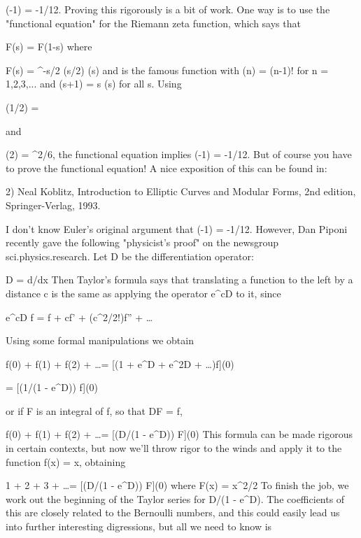                           \zeta (-1) = -1/12.
Proving this rigorously is a bit of work.  One way is to use the
"functional equation" for the Riemann zeta function, which says that 

                             F(s) = F(1-s)
where 

                    F(s) = \pi ^{-s/2} \Gamma (s/2) \zeta (s)
and \Gamma  is the famous function with \Gamma (n) = (n-1)! for n = 1,2,3,...
and \Gamma (s+1) = s \Gamma (s) for all s.  Using 

                       \Gamma (1/2) = \sqrt \pi 

and

                       \zeta (2) = \pi ^{2}/6,
the functional equation implies \zeta (-1) = -1/12.  But of course you have
to prove the functional equation!  A nice exposition of this can be found 
in:

2) Neal Koblitz, Introduction to Elliptic Curves and Modular Forms, 
2nd edition, Springer-Verlag, 1993.

I don't know Euler's original argument that \zeta (-1) = -1/12.  However,
Dan Piponi recently gave the following "physicist's proof" on the
newsgroup sci.physics.research.  Let D be the differentiation operator:

                           D = d/dx
Then Taylor's formula says that translating a function to the left by
a distance c is the same as applying the operator e^{cD} to it, since

                 e^{cD} f  =  f + cf' + 
(c^{2}/2!)f'' + \ldots 

Using some formal manipulations we obtain

   f(0) + f(1) + f(2) + \ldots  = [(1 + e^{D} + e^{2D} + \ldots  )f](0)
               
                  
                                 = [(1/(1 - e^{D})) f](0)

or if F is an integral of f, so that DF = f, 

         f(0) + f(1) + f(2) + \ldots  = [(D/(1 - e^{D})) F](0) 
This formula can be made rigorous in certain contexts, but now we'll
throw rigor to the winds and apply it to the function f(x) = x, obtaining

              1 + 2 + 3 + \ldots  = [(D/(1 - e^{D})) F](0) 
where 
                         F(x) = x^{2}/2
To finish the job, we work out the beginning of
the Taylor series for D/(1 - e^{D}).   The coefficients of this are
closely related to the Bernoulli numbers, and this could easily lead us
into further interesting digressions, but all we need to know is

